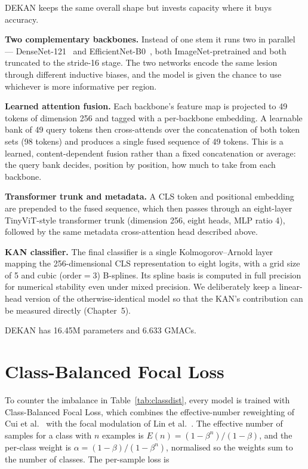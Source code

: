 DEKAN keeps the same overall shape but invests capacity where it buys accuracy.

\textbf{Two complementary backbones.} Instead of one stem it runs two in
parallel --- DenseNet-121~\cite{huang2017densenet} and
EfficientNet-B0~\cite{tan2019efficientnet}, both ImageNet-pretrained and both
truncated to the stride-16 stage. The two networks encode the same lesion through
different inductive biases, and the model is given the chance to use whichever is
more informative per region.

\textbf{Learned attention fusion.} Each backbone's feature map is projected to
49 tokens of dimension 256 and tagged with a per-backbone embedding. A learnable
bank of 49 query tokens then cross-attends over the concatenation of both token
sets (98 tokens) and produces a single fused sequence of 49 tokens. This is a
learned, content-dependent fusion rather than a fixed concatenation or average:
the query bank decides, position by position, how much to take from each
backbone.

\textbf{Transformer trunk and metadata.} A CLS token and positional embedding are
prepended to the fused sequence, which then passes through an eight-layer
TinyViT-style transformer trunk (dimension 256, eight heads, MLP ratio 4),
followed by the same metadata cross-attention head described above.

\textbf{KAN classifier.} The final classifier is a single Kolmogorov--Arnold
layer~\cite{liu2024kan} mapping the 256-dimensional CLS representation to eight
logits, with a grid size of 5 and cubic ($\text{order}=3$) B-splines. Its spline
basis is computed in full precision for numerical stability even under mixed
precision. We deliberately keep a linear-head version of the otherwise-identical
model so that the KAN's contribution can be measured directly (Chapter~5).

DEKAN has 16.45M parameters and 6.633 GMACs.

\section{Class-Balanced Focal Loss}

To counter the imbalance in Table~\ref{tab:classdist}, every model is trained
with Class-Balanced Focal Loss, which combines the effective-number reweighting
of Cui et al.~\cite{cui2019classbalanced} with the focal modulation of Lin et
al.~\cite{lin2017focal}. The effective number of samples for a class with $n$
examples is $E(n) = (1-\beta^{n})/(1-\beta)$, and the per-class weight is
$\alpha = (1-\beta)/(1-\beta^{n})$, normalised so the weights sum to the number
of classes. The per-sample loss is


